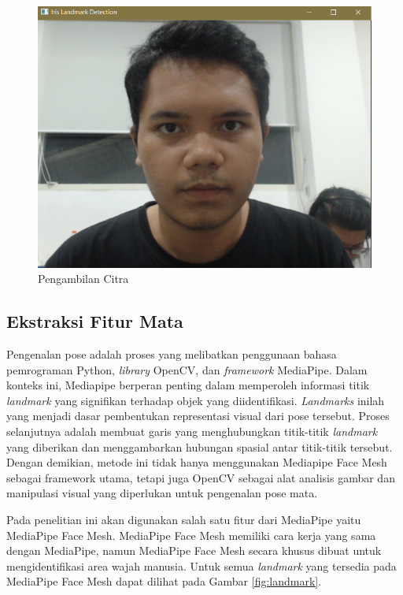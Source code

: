 \begin{figure} [H] \centering
  \includegraphics[scale=0.35]{gambar/bab3/citra.png}
  \caption{Pengambilan Citra}
  \label{fig:citra}
\end{figure}

\subsection{Ekstraksi Fitur Mata}
Pengenalan pose adalah proses yang melibatkan penggunaan bahasa pemrograman Python, \emph{library} OpenCV, dan \emph{framework} MediaPipe. Dalam konteks ini, Mediapipe berperan penting dalam memperoleh informasi titik \emph{landmark} yang signifikan terhadap objek yang diidentifikasi. \emph{Landmarks} inilah yang menjadi dasar pembentukan representasi visual dari pose tersebut. Proses selanjutnya adalah membuat garis yang menghubungkan titik-titik \emph{landmark} yang diberikan dan menggambarkan hubungan spasial antar titik-titik tersebut. Dengan demikian, metode ini tidak hanya menggunakan Mediapipe Face Mesh sebagai framework utama, tetapi juga  OpenCV sebagai alat analisis gambar dan manipulasi visual yang diperlukan untuk pengenalan pose mata.

Pada penelitian ini akan digunakan salah satu fitur dari MediaPipe yaitu MediaPipe Face Mesh. MediaPipe Face Mesh memiliki cara kerja yang sama dengan MediaPipe, namun MediaPipe Face Mesh secara khusus dibuat untuk mengidentifikasi area wajah manusia. Untuk semua \textit{landmark} yang tersedia pada MediaPipe Face Mesh dapat dilihat pada Gambar \ref{fig:landmark}.

